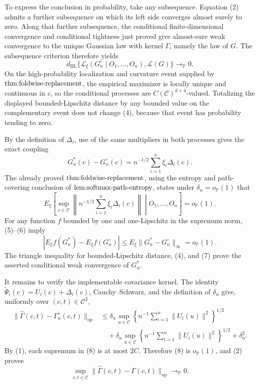 To express the conclusion in probability, take any subsequence.  Equation (2) admits a further subsequence on which its left side converges almost surely to zero.  Along that further subsequence, the conditional finite-dimensional convergence and conditional tightness just proved give almost-sure weak convergence to the unique Gaussian law with kernel \(\Gamma\), namely the law of \(G\).  The subsequence criterion therefore yields
\[
 d_{\mathrm{BL}}\{\mathcal L_\xi(G_n^\circ\mid O_1,\ldots,O_n),\mathcal L(G)\}
 \longrightarrow_{\mathbb P}0. \tag{4}
\]
On the high-probability localization and curvature event supplied by \(\textnormal{thm:foldwise-replacement}\), the empirical maximizer is locally unique and continuous in \(c\), so the conditional processes are \(C(\mathcal C)^{d+4}\)-valued.  Totalizing the displayed bounded-Lipschitz distance by any bounded value on the complementary event does not change (4), because that event has probability tending to zero.

By the definition of \(\Delta_i\), use of the same multipliers in both processes gives the exact coupling
\[
 G_n^*(c)-G_n^\circ(c)
 =n^{-1/2}\sum_{i=1}^n\xi_i\Delta_i(c). \tag{5}
\]
The already proved \(\textnormal{thm:foldwise-replacement}\), using the entropy and path-covering conclusion of \(\textnormal{lem:softmax-path-entropy}\), states under \(\delta_n=o_{\mathbb P}(1)\) that
\[
 E_\xi\left[
 \sup_{c\in\mathcal C}\left\|n^{-1/2}\sum_{i=1}^n\xi_i\Delta_i(c)\right\|
 \middle|O_1,\ldots,O_n\right]=o_{\mathbb P}(1). \tag{6}
\]
For any function \(f\) bounded by one and one-Lipschitz in the supremum norm, (5)--(6) imply
\[
 \left|E_\xi f(G_n^*)-E_\xi f(G_n^\circ)\right|
 \le E_\xi\|G_n^*-G_n^\circ\|_\infty=o_{\mathbb P}(1). \tag{7}
\]
The triangle inequality for bounded-Lipschitz distance, (4), and (7) prove the asserted conditional weak convergence of \(G_n^*\).

It remains to verify the implementable covariance kernel.  The identity \(\widetilde\Psi_i(c)=U_i(c)+\Delta_i(c)\), Cauchy--Schwarz, and the definition of \(\delta_n\) give, uniformly over \((c,t)\in\mathcal C^2\),
\[
\begin{aligned}
 \|\widehat\Gamma(c,t)-\Gamma_n^\circ(c,t)\|_{\mathrm{op}}
 &\le \delta_n\sup_{u\in\mathcal C}
 \left\{n^{-1}\sum_{i=1}^n\|U_i(u)\|^2\right\}^{1/2}\\
 &\quad+\delta_n\sup_{u\in\mathcal C}
 \left\{n^{-1}\sum_{i=1}^n\|U_i(u)\|^2\right\}^{1/2}
 +\delta_n^2. 
\end{aligned} \tag{8}
\]
By (1), each supremum in (8) is at most \(2C\).  Therefore (8) is \(o_{\mathbb P}(1)\), and (2) proves
\[
 \sup_{c,t\in\mathcal C}
 \|\widehat\Gamma(c,t)-\Gamma(c,t)\|_{\mathrm{op}}
 \longrightarrow_{\mathbb P}0.
\]

